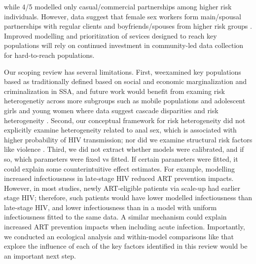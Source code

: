 while 4/5 modelled only casual/commercial partnerships among higher risk individuals.
However, data suggest that female sex workers form main/spousal partnerships
with regular clients and boyfriends/spouses from higher risk groups \cite{Scorgie2012}.
Improved modelling and prioritization of sevices designed to reach key populations
will rely on continued investment in community-led data collection for hard-to-reach populations.
\par
Our scoping review has several limitations.
First, weexamined key populations based as traditionally defined based on social and economic marginalization and criminalization in SSA, 
and  %
future work would benefit from examing risk  heterogenetiy across more subgroups such as mobile populations and adolescent girls and young women
where data suggest cascade disparities and risk heterogeneity \cite{Tanser2015,Dellar2015}.
Second, our conceptual framework for risk heterogeneity did not explicitly examine
heterogeneity related to anal sex, which is associated with higher probability of HIV transmission; 
nor did we examine structural risk factors like violence \cite{Silverman2011,Baggaley2013}.
Third, we did not extract whether models were calibrated,
and if so, which parameters were fixed vs fitted.
If certain parameters were fitted, it could explain some counterintuitive effect estimates.
For example, modelling increased infectiousness in late-stage HIV reduced ART prevention impacts.
However, in most studies, newly ART-eligible patients via scale-up had earlier stage HIV;
therefore, such patients would have lower modelled infectiousness than late-stage HIV,
and lower infectiousness than in a model with uniform infectiousness fitted to the same data.
A similar mechanism could explain increased ART prevention impacts when including acute infection. 
Importantly, we conducted an ecological analysis and within-model comparisons like \cite{Dodd2010,Hontelez2013} that explore
the influence of each of the key factors identified in this review would be an important next step.

